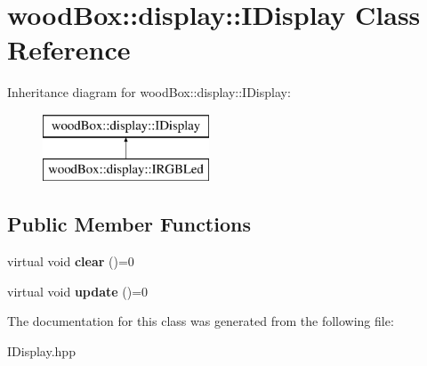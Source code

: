 \hypertarget{classwood_box_1_1display_1_1_i_display}{}\section{wood\+Box\+:\+:display\+:\+:I\+Display Class Reference}
\label{classwood_box_1_1display_1_1_i_display}
Inheritance diagram for wood\+Box\+:\+:display\+:\+:I\+Display\+:\begin{figure}[H]
\begin{center}
\leavevmode
\includegraphics[height=2.000000cm]{classwood_box_1_1display_1_1_i_display}
\end{center}
\end{figure}
\subsection*{Public Member Functions}
\begin{DoxyCompactItemize}
\item 
\mbox{\label{classwood_box_1_1display_1_1_i_display_a7030f0768c1ef15ce936a259406168dc}} 
virtual void {\bfseries clear} ()=0
\item 
\mbox{\label{classwood_box_1_1display_1_1_i_display_ad8c0811b8b807ce119a06c7806004de7}} 
virtual void {\bfseries update} ()=0
\end{DoxyCompactItemize}


The documentation for this class was generated from the following file\+:\begin{DoxyCompactItemize}
\item 
I\+Display.\+hpp\end{DoxyCompactItemize}
